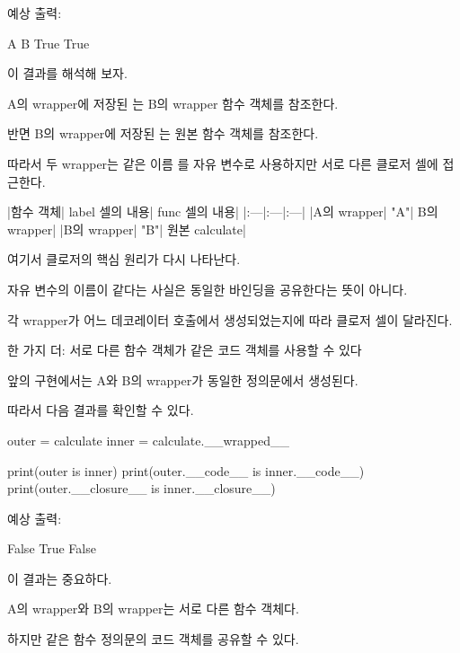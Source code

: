 예상 출력:

\begin{dhkzsh}
A
B
True
True
\end{dhkzsh}

이 결과를 해석해 보자.

A의 wrapper에 저장된 는 B의 wrapper 함수 객체를 참조한다.

반면 B의 wrapper에 저장된 는 원본  함수 객체를 참조한다.

따라서 두 wrapper는 같은 이름 를 자유 변수로 사용하지만 서로 다른 클로저 셀에 접근한다.

\begin{dhktable}
|함수 객체|	label 셀의 내용|	func 셀의 내용|
|:---|:---|:---|
|A의 wrapper|	"A"|	B의 wrapper|
|B의 wrapper|	"B"|	원본 calculate|
\end{dhktable}

여기서 클로저의 핵심 원리가 다시 나타난다.

자유 변수의 이름이 같다는 사실은 동일한 바인딩을 공유한다는 뜻이 아니다.

각 wrapper가 어느 데코레이터 호출에서 생성되었는지에 따라 클로저 셀이 달라진다.

\begin{dhknote}
\begin{dhksmry}[centered]
한 가지 더: 서로 다른 함수 객체가 같은 코드 객체를 사용할 수 있다
\end{dhksmry}
\end{dhknote}

앞의  구현에서는 A와 B의 wrapper가 동일한  정의문에서 생성된다.

따라서 다음 결과를 확인할 수 있다.

\begin{dhkcode}
outer = calculate
inner = calculate.__wrapped__

print(outer is inner)
print(outer.__code__ is inner.__code__)
print(outer.__closure__ is inner.__closure__)
\end{dhkcode}

예상 출력:

\begin{dhkzsh}
False
True
False
\end{dhkzsh}

이 결과는 중요하다.

A의 wrapper와 B의 wrapper는 서로 다른 함수 객체다.

하지만 같은 함수 정의문의 코드 객체를 공유할 수 있다.

